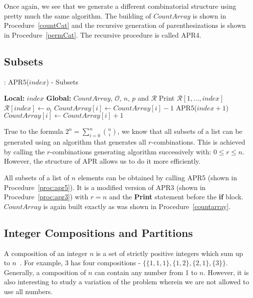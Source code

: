\documentclass{article}
\begin{document}
Once again, we see that we generate a different combinatorial structure using pretty much the same algorithm. The building of $CountArray$ is shown in Procedure~\ref{countCat} and the recursive generation of parenthesizations is shown in Procedure~\ref{permCat}. The recursive procedure is called APR4.

\subsection{Subsets}

\begin{algorithm}
\begin{algorithmic}[1]
\caption{: APR5($index$) - Subsets}
\label{proc:apr5}
\STATE \textbf{Local:} $index$
\STATE \textbf{Global:} $CountArray$, $\mathcal{O}$, $n$, $p$ and $\mathcal{R}$
\medskip
\STATE Print $\mathcal{R}[1, \ldots, index]$ \label{proc:apr5:line:print}
	\RETURN
\ELSE
		 \label{proc:apr5:line:cond}
			\STATE $\mathcal{R}[index] \gets o_i$ 
			\STATE $CountArray[i] \gets CountArray[i] - 1$
			\STATE APR5($index + 1$)
			\STATE $CountArray[i] \gets CountArray[i] + 1$
		\ENDIF
	\ENDFOR
\ENDIF
\end{algorithmic}
\end{algorithm}

True to the formula $2^n = \sum_{i=0}^n \binom{n}{i}$, we know that all subsets of a list can be generated using an algorithm that generates all $r$-combinations. This is achieved by calling the $r$-combinations generating algorithm successively with: $0 \le r \le n$. However, the structure of APR allows us to do it more efficiently.

All subsets of a list of $n$ elements can be obtained by calling APR5 (shown in Procedure~\ref{proc:apr5}). It is a modified version of APR3 (shown in Procedure~\ref{proc:apr3}) with $r=n$ and the \textbf{Print} statement before the \textbf{if} block. $CountArray$ is again built exactly as was shown in Procedure~\ref{countarray}.

\subsection{Integer Compositions and Partitions}

A composition of an integer $n$ is a set of strictly positive integers which sum up to $n$~\cite{compositions}. For example, 3 has four compositions - $\big\{\{1,1,1\},\{1,2\},\{2,1\},\{3\}\big\}$. Generally, a composition of $n$ can contain any number from 1 to $n$. However, it is also interesting to study a variation of the problem wherein we are not allowed to use all numbers.
\end{document}
